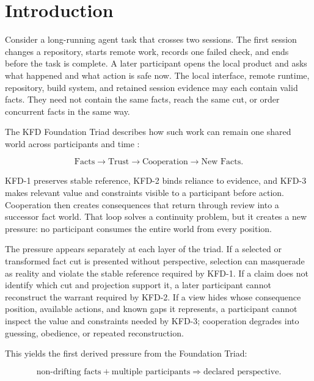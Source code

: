 \section{Introduction}

Consider a long-running agent task that crosses two sessions. The first
session changes a repository, starts remote work, records one failed check, and
ends before the task is complete. A later participant opens the local product
and asks what happened and what action is safe now. The local interface, remote
runtime, repository, build system, and retained session evidence may each
contain valid facts. They need not contain the same facts, reach the same cut,
or order concurrent facts in the same way.

The KFD Foundation Triad describes how such work can remain one shared world
across participants and time \cite{kfdFoundation2026}:

\begin{equation}
\text{Facts} \rightarrow \text{Trust} \rightarrow \text{Cooperation}
\rightarrow \text{New Facts}.
\end{equation}

KFD-1 preserves stable reference, KFD-2 binds reliance to evidence, and KFD-3
makes relevant value and constraints visible to a participant before action.
Cooperation then creates consequences that return through review into a
successor fact world. That loop solves a continuity problem, but it creates a
new pressure: no participant consumes the entire world from every position.

The pressure appears separately at each layer of the triad. If a selected or
transformed fact cut is presented without perspective, selection can masquerade
as reality and violate the stable reference required by KFD-1. If a claim does
not identify which cut and projection support it, a later participant cannot
reconstruct the warrant required by KFD-2. If a view hides whose consequence
position, available actions, and known gaps it represents, a participant cannot
inspect the value and constraints needed by KFD-3; cooperation degrades into
guessing, obedience, or repeated reconstruction.

This yields the first derived pressure from the Foundation Triad:

\begin{equation}
\text{non-drifting facts} + \text{multiple participants}
\Longrightarrow \text{declared perspective}.
\end{equation}

